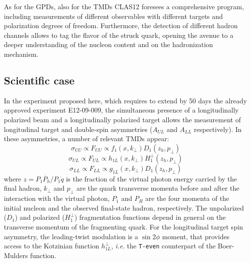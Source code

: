 %
%
As for the GPDs, also for the TMDs CLAS12 foresees a comprehensive  program, including measurements of different observables with different targets and polarization degrees of freedom. 
Furthermore, the detection of different hadron channels allows to tag the flavor of the struck quark, opening the avenue to a deeper understanding of the nucleon content and on the hadronization mechanism.\\
%
\subsection{Scientific case}
%
In the experiment proposed here, which requires to extend by 50 days the already approved experiment E12-09-009, the simultaneous presence of a longitudinally polarized beam and a longitudinally polarized target allows the measurement of longitudinal target and double-spin asymmetries ($A_{UL}$ and $A_{LL}$ respectively). In these asymmetries, a number of relevant TMDs appear:
%
\begin{equation}
\sigma_{UU} \propto F_{UU} \propto f_1(x, k_\perp) D_1(z_h, p_\perp) 
\end{equation}
%
\begin{equation}
\sigma_{UL} \propto F_{UL} \propto h_{1L}(x, k_\perp) H^\perp_1(z_h, p_\perp) 
\end{equation}
%
\begin{equation}
\sigma_{LL} \propto F_{LL} \propto g_{1L}(x, k_\perp) D_1(z_h, p_\perp) 
\end{equation}
%
%
where $z=P_1\dot{P_h}/P_1\dot{q}$ is the fraction of the virtual photon energy carried by the final hadron, $k_\perp$ and $p_\perp$ are the quark transverse momenta before and after the interaction with the virtual photon, $P_1$ and $P_H$ are the four momenta of the initial nucleon and the observed final-state hadron, respectively. 
The unpolarized ($D_1$) and polarized ($H^\perp_1$) fragmentation functions depend in general on the transverse momentum of the fragmenting quark.
For the longitudinal target spin asymmetry, the leading-twist modulation is a $\sin2\phi$ moment, that provides access to the Kotzinian function $h_{1 L}^{\perp}$, \textit{i.e.} the \texttt{T-even} counterpart of the Boer-Mulders function. 
